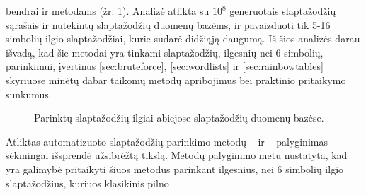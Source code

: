 \documentclass{VUMIFInfBakalaurinis}
\begin{document}
bendrai  ir  metodams (žr. 
\ref{plot:picked-lengths}). Analizė atlikta su $10^8$ generuotais slaptažodžių 
sąrašais  ir  nutekintų slaptažodžių 
duomenų bazėms, ir pavaizduoti tik 5-16 simbolių ilgio slaptažodžiai, kurie 
sudarė didžiąją daugumą. Iš šios analizės darau išvadą, kad šie metodai yra 
tinkami slaptažodžių, ilgesnių nei 6 simbolių, parinkimui, įvertinus 
\ref{sec:bruteforce}, \ref{sec:wordlists} ir \ref{sec:rainbowtables} skyriuose 
minėtų dabar taikomų metodų apribojimus bei praktinio pritaikymo sunkumus.
\begin{figure}[!ht]
  \begin{center}
  \end{center}
  \caption{Parinktų slaptažodžių ilgiai abiejose slaptažodžių duomenų bazėse.}
  \label{plot:picked-lengths}
\end{figure}
Atliktas automatizuoto slaptažodžių parinkimo metodų --  ir 
 -- palyginimas sėkmingai išsprendė užsibrėžtą tikslą. Metodų 
palyginimo metu nustatyta, kad yra galimybė pritaikyti šiuos metodus parinkant 
ilgesnius, nei 6 simbolių ilgio slaptažodžius, kuriuos klasikinis pilno 
\end{document}
